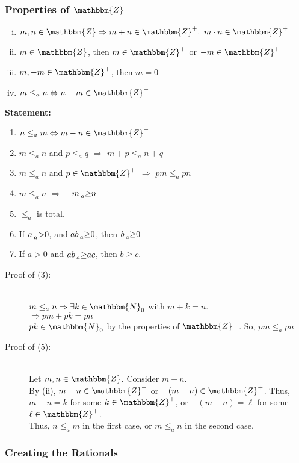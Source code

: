 \documentclass[10pt]{extarticle}
\newcommand{\N}{\mathbbm{N}}
\newcommand{\Z}{\mathbbm{Z}}
\begin{document}
    \subsubsection{Properties of $\Z^+$}%
    \begin{enumerate}[(i)]
      \item $m,n\in \Z\Rightarrow m+n\in\Z^+,~m\cdot n\in \Z^+$
      \item $m\in \Z$, then $m\in \Z^+$ or $-m\in\Z^+$
      \item $m,-m\in \Z^+$, then $m=0$
      \item $m\leq_a n \Leftrightarrow n-m\in\Z^+$
    \end{enumerate}
    \textbf{Statement:}
      \begin{enumerate}[(\arabic*)]
        \item $n\leq_a m\Leftrightarrow m-n\in\Z^+$
        \item $m\leq_a n$ and $p\leq_a q$ $\Rightarrow$ $m+p \leq_a n+q$
        \item $m\leq_a n$ and $p\in \Z^+$ $\Rightarrow$ $pm\leq_a pn$
        \item $m\leq_a n$ $\Rightarrow$ $-m \prescript{}{a}\geq n$
        \item $\leq_a$ is total.
        \item If $a \prescript{}{a}>0$, and $ab \prescript{}{a}\geq 0$, then $b\prescript{}{a}\geq 0$
        \item If $a > 0$ and $ab \prescript{}{a}\geq ac$, then $b\geq c$.
      \end{enumerate}
      \begin{description}
        \item[Proof of (3):]\hfill\\
          $m\leq_a n \Rightarrow \exists k\in \N_0$ with $m+k = n$.\\
          $\Rightarrow pm + pk = pn$\\
          $pk\in \N_0$ by the properties of $\Z^+$. So, $pm \leq_a pn$
        \item[Proof of (5):]\hfill\\
          Let $m,n\in\Z$. Consider $m-n$.\\
          By (ii), $m-n\in\Z^+$ or $-(m-n)\in\Z^+$. Thus, $m-n = k$ for some $k\in\Z^+$, or $-(m-n) = \ell$ for some $\ell\in\Z^+$.\\
          Thus, $n\leq_a m$ in the first case, or $m\leq_a n$ in the second case.
      \end{description}
    \subsubsection{Creating the Rationals}%
    
\end{document}

